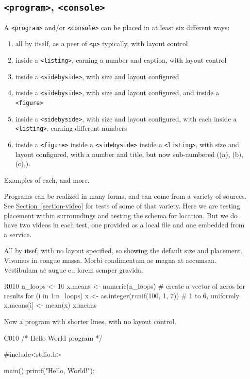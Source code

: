 \documentclass{amsart}
\theoremstyle{plain}%
\theoremstyle{definition}%
\theoremstyle{remark}%
\newcommand{\xreffont}{\relax}
\newcommand{\mono}[1]{\texttt{#1}}
\numberwithin{equation}{section}
\begin{document}
\subsection{\mono{<program>}, \mono{<console>}}\label{atomic-program}%
A \mono{<program>} and\slash{}or \mono{<console>} can be placed in at least six  different ways:%
\begin{enumerate}
\item{}all by itself, as a peer of \mono{<p>} typically, with layout control%
\item{}inside a \mono{<listing>}, earning a number and caption, with layout control%
\item{}inside a \mono{<sidebyside>}, with size and layout configured%
\item{}inside a \mono{<sidebyside>}, with size and layout configured, and inside a \mono{<figure>}%
\item{}inside a \mono{<sidebyside>}, with size and layout configured, with each inside a \mono{<listing>}, earning different numbers%
\item{}inside a \mono{<figure>} inside a \mono{<sidebyside>} inside a \mono{<listing>}, with size and layout configured, with a number and title, but now sub-numbered ((a), (b), (c),\textellipsis{}).%
\end{enumerate}
Examples of each, and more.%
\par
Programs can be realized in many forms, and can come from a variety of sources.  See \hyperref[section-video]{Section~{\xreffont\ref{section-video}}} for tests of some of that variety.  Here we are testing placement within surroundings and testing the schema for location.  But we do have two videos in each test, one provided as a local file and one embedded from a service.%
\par
All by itsef, with no layout specified, so showing the default size and placement.  Vivamus in congue massa. Morbi condimentum ac magna at accumsan. Vestibulum ac augue eu lorem semper gravida.%
\begin{program}{R}{0}{1}{0}
n_loops <- 10
x.means <- numeric(n_loops)  # create a vector of zeros for results
for (i in 1:n_loops){
    x <- as.integer(runif(100, 1, 7))  # 1 to 6, uniformly
    x.means[i] <- mean(x)
}
x.means
\end{program}
Now a program with shorter lines, with no layout control.%
\begin{program}{C}{0}{1}{0}
/* Hello World program */

#include<stdio.h>

main()
{
    printf("Hello, World!");
}
\end{program}
\end{document}
